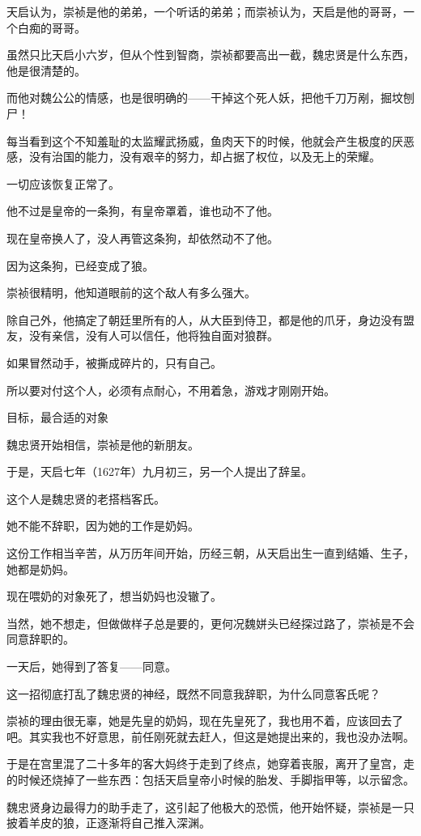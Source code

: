 \begin{multicols}{\theparacolNo}
		天启认为，崇祯是他的弟弟，一个听话的弟弟；而崇祯认为，天启是他的哥哥，一个白痴的哥哥。

		虽然只比天启小六岁，但从个性到智商，崇祯都要高出一截，魏忠贤是什么东西，他是很清楚的。

		而他对魏公公的情感，也是很明确的——干掉这个死人妖，把他千刀万剐，掘坟刨尸！

		每当看到这个不知羞耻的太监耀武扬威，鱼肉天下的时候，他就会产生极度的厌恶感，没有治国的能力，没有艰辛的努力，却占据了权位，以及无上的荣耀。

		一切应该恢复正常了。

		他不过是皇帝的一条狗，有皇帝罩着，谁也动不了他。

		现在皇帝换人了，没人再管这条狗，却依然动不了他。

		因为这条狗，已经变成了狼。

		崇祯很精明，他知道眼前的这个敌人有多么强大。

		除自己外，他搞定了朝廷里所有的人，从大臣到侍卫，都是他的爪牙，身边没有盟友，没有亲信，没有人可以信任，他将独自面对狼群。

		如果冒然动手，被撕成碎片的，只有自己。

		所以要对付这个人，必须有点耐心，不用着急，游戏才刚刚开始。

		目标，最合适的对象

		魏忠贤开始相信，崇祯是他的新朋友。

		于是，天启七年（1627年）九月初三，另一个人提出了辞呈。

		这个人是魏忠贤的老搭档客氏。

		她不能不辞职，因为她的工作是奶妈。

		这份工作相当辛苦，从万历年间开始，历经三朝，从天启出生一直到结婚、生子，她都是奶妈。

		现在喂奶的对象死了，想当奶妈也没辙了。

		当然，她不想走，但做做样子总是要的，更何况魏姘头已经探过路了，崇祯是不会同意辞职的。

		一天后，她得到了答复——同意。

		这一招彻底打乱了魏忠贤的神经，既然不同意我辞职，为什么同意客氏呢？

		崇祯的理由很无辜，她是先皇的奶妈，现在先皇死了，我也用不着，应该回去了吧。其实我也不好意思，前任刚死就去赶人，但这是她提出来的，我也没办法啊。

		于是在宫里混了二十多年的客大妈终于走到了终点，她穿着丧服，离开了皇宫，走的时候还烧掉了一些东西：包括天启皇帝小时候的胎发、手脚指甲等，以示留念。

		魏忠贤身边最得力的助手走了，这引起了他极大的恐慌，他开始怀疑，崇祯是一只披着羊皮的狼，正逐渐将自己推入深渊。


\end{multicols}
